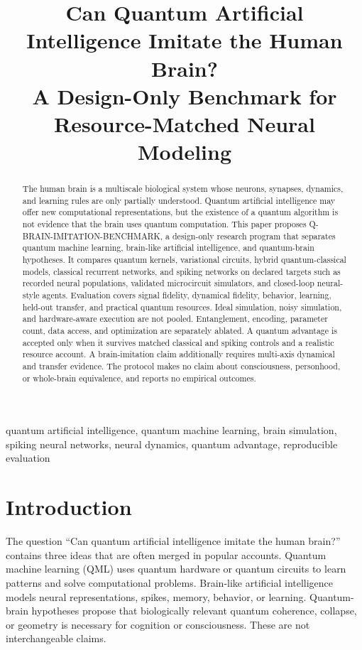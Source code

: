 \documentclass[conference]{IEEEtran}
\title{Can Quantum Artificial Intelligence Imitate the Human Brain?\\
A Design-Only Benchmark for Resource-Matched Neural Modeling}
\author{\IEEEauthorblockN{Four-Agent Research Workflow}
\IEEEauthorblockA{Survey -- Idea -- ExperimentDesign -- Author\\
Design-only research report}}
\begin{document}
\maketitle

\begin{abstract}
The human brain is a multiscale biological system whose neurons, synapses, dynamics,
and learning rules are only partially understood. Quantum artificial intelligence may
offer new computational representations, but the existence of a quantum algorithm is
not evidence that the brain uses quantum computation. This paper proposes
Q-BRAIN-IMITATION-BENCHMARK, a design-only research program that separates quantum
machine learning, brain-like artificial intelligence, and quantum-brain hypotheses. It
compares quantum kernels, variational circuits, hybrid quantum-classical models,
classical recurrent networks, and spiking networks on declared targets such as recorded
neural populations, validated microcircuit simulators, and closed-loop neural-style
agents. Evaluation covers signal fidelity, dynamical fidelity, behavior, learning,
held-out transfer, and practical quantum resources. Ideal simulation, noisy simulation,
and hardware-aware execution are not pooled. Entanglement, encoding, parameter count,
data access, and optimization are separately ablated. A quantum advantage is accepted
only when it survives matched classical and spiking controls and a realistic resource
account. A brain-imitation claim additionally requires multi-axis dynamical and transfer
evidence. The protocol makes no claim about consciousness, personhood, or whole-brain
equivalence, and reports no empirical outcomes.
\end{abstract}

\begin{IEEEkeywords}
quantum artificial intelligence, quantum machine learning, brain simulation, spiking
neural networks, neural dynamics, quantum advantage, reproducible evaluation
\end{IEEEkeywords}

\section{Introduction}
\label{sec:introduction}

The question ``Can quantum artificial intelligence imitate the human brain?'' contains
three ideas that are often merged in popular accounts. Quantum machine learning (QML)
uses quantum hardware or quantum circuits to learn patterns and solve computational
problems. Brain-like artificial intelligence models neural representations, spikes,
memory, behavior, or learning. Quantum-brain hypotheses propose that biologically
relevant quantum coherence, collapse, or geometry is necessary for cognition or
consciousness. These are not interchangeable claims.
\end{document}
